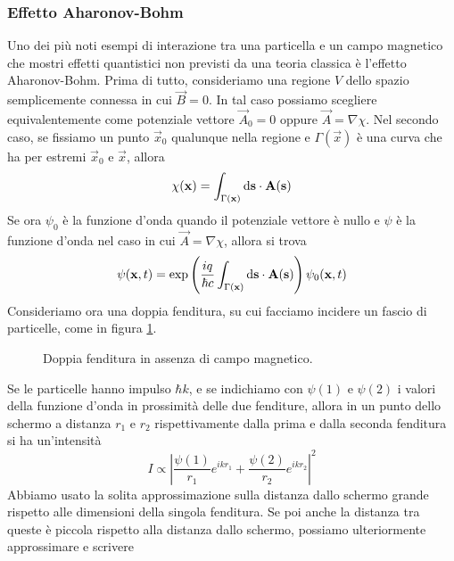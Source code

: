 \documentclass[a4paper, 11pt]{article}
\begin{document}
\subsubsection{Effetto Aharonov-Bohm}
Uno dei più noti esempi di interazione tra una particella e un campo magnetico che mostri effetti quantistici non previsti da una teoria classica è l'effetto Aharonov-Bohm. Prima di tutto, consideriamo una regione $V$ dello spazio semplicemente connessa in cui $\vec{B}=0$. In tal caso possiamo scegliere equivalentemente come potenziale vettore $\vec{A}_0=0$ oppure $\vec{A}=\nabla\chi$. Nel secondo caso, se fissiamo un punto $\vec{x}_0$ qualunque nella regione e $\Gamma(\vec{x})$ è una curva che ha per estremi $\vec{x}_0$ e $\vec{x}$, allora
\[\chi(\mathbf{x})=\int_{\Gamma(\mathbf{x})}\mathrm{d} \mathbf{s}\cdot\mathbf{A}(\mathbf{s})\]
Se ora $\psi_0$ è la funzione d'onda quando il potenziale vettore è nullo e $\psi$ è la funzione d'onda nel caso in cui $\vec{A}=\nabla\chi$, allora si trova
\[\psi(\mathbf{x},t)=\exp\left(\frac{iq}{\hbar c}\int_{\Gamma(\mathbf{x})}\mathrm{d} \mathbf{s}\cdot\mathbf{A}(\mathbf{s})\right)\psi_0(\mathbf{x},t)\]
Consideriamo ora una doppia fenditura, su cui facciamo incidere un fascio di particelle, come in figura \ref{fig:fend1}.
\begin{figure}[h!]
	\centering
	\caption{Doppia fenditura in assenza di campo magnetico.}
	\label{fig:fend1}
\end{figure} Se le particelle hanno impulso $\hbar k$, e se indichiamo con $\psi(1)$ e $\psi(2)$ i valori della funzione d'onda in prossimità delle due fenditure, allora in un punto dello schermo a distanza $r_1$ e $r_2$ rispettivamente dalla prima e dalla seconda fenditura si ha un'intensità
\[I\propto\left|\frac{\psi(1)}{r_1}e^{ikr_1}+\frac{\psi(2)}{r_2}e^{ikr_2}\right|^2\]
Abbiamo usato la solita approssimazione sulla distanza dallo schermo grande rispetto alle dimensioni della singola fenditura. Se poi anche la distanza tra queste è piccola rispetto alla distanza dallo schermo, possiamo ulteriormente approssimare e scrivere
\end{document}

